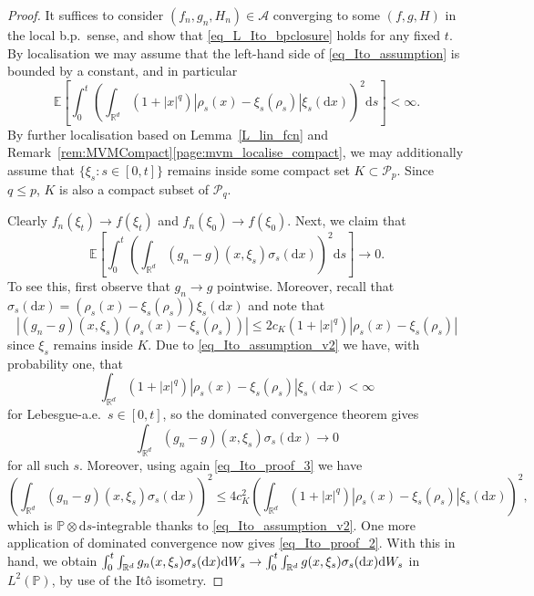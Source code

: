 \documentclass{article}
\theoremstyle{definition}
\numberwithin{equation}{section}
\numberwithin{theorem}{section}
\newcommand{\E}{\mathbb{E}}
\renewcommand{\P}{\mathbb{P}}
\newcommand{\R}{\mathbb{R}}
\newcommand{\dx}{\mathrm{d}x}
\newcommand{\ds}{\mathrm{d}s}
\renewcommand{\d}{{\rm d}}
\renewcommand{\P}{{\mathbb P}}
\newcommand{\Acal}{{\mathcal A}}
\newcommand{\Pcal}{{\mathcal P}}
\begin{document}
\begin{proof}
It suffices to consider $(f_n,g_n,H_n)\in\Acal$ converging to some $(f,g,H)$ in the local b.p.~sense, and show that \eqref{eq_L_Ito_bpclosure} holds for any fixed $t$. By localisation we may assume that the left-hand side of \eqref{eq_Ito_assumption} is bounded by a constant, and in particular
\begin{equation}\label{eq_Ito_assumption_v2}
\E\left[ \int_0^t \left( \int_{\R^d} (1 + |x|^q) |\rho_s(x) - \xi_s(\rho_s)| \xi_s(\dx) \right)^2 \ds \right] < \infty.
\end{equation}
By further localisation based on Lemma~\ref{L_lin_fcn} and  Remark~\ref{rem:MVMCompact}\ref{page:mvm_localise_compact}, we may additionally assume that $\{\xi_s\colon s\in[0,t]\}$ remains inside some compact set $K\subset\Pcal_p$. Since $q \le p$, $K$ is also a compact subset of $\Pcal_q$.

Clearly $f_n(\xi_t)\to f(\xi_t)$ and $f_n(\xi_0)\to f(\xi_0)$. Next, we claim that
\begin{equation}\label{eq_Ito_proof_2}
\E\left[ \int_0^t \left( \int_{\R^d} (g_n-g)(x,\xi_s)\sigma_s(\dx)\right)^2 \ds \right] \to 0.
\end{equation}
To see this, first observe that $g_n \to g$ pointwise. Moreover, recall that $\sigma_s(\dx) = (\rho_s(x) - \xi_s(\rho_s))\xi_s(\dx)$ and note that
\begin{equation}\label{eq_Ito_proof_3}
| (g_n - g)(x,\xi_s) (\rho_s(x) - \xi_s(\rho_s)) | \le 2 c_K (1 + |x|^q) |\rho_s(x) - \xi_s(\rho_s)|
\end{equation}
since $\xi_s$ remains inside $K$. Due to \eqref{eq_Ito_assumption_v2} we have, with probability one, that
\[
\int_{\R^d} (1 + |x|^q) |\rho_s(x) - \xi_s(\rho_s)| \xi_s(\dx) < \infty
\]
for Lebesgue-a.e.~$s \in [0,t]$, so the dominated convergence theorem gives
\[
\int_{\R^d} (g_n-g)(x,\xi_s)\sigma_s(\dx) \to 0
\]
for all such $s$. Moreover, using again \eqref{eq_Ito_proof_3} we have
\[
\left( \int_{\R^d} (g_n-g)(x,\xi_s)\sigma_s(\dx)\right)^2 \le 4 c_K^2 \left( \int_{\R^d} (1 + |x|^q) |\rho_s(x) - \xi_s(\rho_s)| \xi_s(\dx) \right)^2,
\]
which is $\P \otimes \ds$-integrable thanks to \eqref{eq_Ito_assumption_v2}. One more application of dominated convergence now gives \eqref{eq_Ito_proof_2}. With this in hand, we obtain $\int_0^t \int_{\R^d} g_n(x,\xi_s)\sigma_s(\dx) \d W_s\to\int_0^t \int_{\R^d} g(x,\xi_s)\sigma_s(\dx) \d W_s$ in $L^2(\P)$, by use of the It\^o isometry.


\end{proof}
\end{document}
